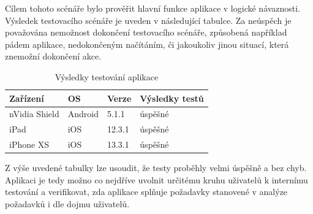 Cílem tohoto scénáře bylo prověřit hlavní funkce aplikace v logické návaznosti. Výsledek testovacího scénáře je uveden v následující tabulce. Za neúspěch je považována nemožnost dokončení testovacího scénáře, způsobená například pádem aplikace, nedokončeným načítáním, či jakoukoliv jinou situací, která znemožní dokončení akce.

\begin{table}[H]
	\begin{tabularx}{\textwidth}{|X|X|X|X|}
		\hline
		Zařízení        & OS      & Verze  & Výsledky testů \\ \hline
		nVidia Shield   & Android & 5.1.1  & úspěšné \\ \hline
		iPad            & iOS     & 12.3.1       & úspěšné    \\ \hline
		iPhone XS       & iOS     & 13.3.1 &  úspěšné  \\ \hline
	\end{tabularx}
	\caption{Výsledky testování aplikace}
\end{table}

Z výše uvedené tabulky lze usoudit, že testy proběhly velmi úspěšně a bez chyb. Aplikaci je tedy možno co nejdříve uvolnit určitému kruhu uživatelů k internímu testování a verifikovat, zda aplikace splňuje požadavky stanovené v analýze požadavků i dle dojmu uživatelů.